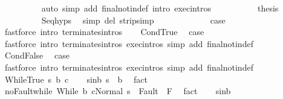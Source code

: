 \begin{isabellebody}
\ \ \ \ \ \ \ \ \isamarkupfalse%
\ {\isacharparenleft}auto\ simp\ add{\isacharcolon}\ final{\isacharunderscore}notin{\isacharunderscore}def\ intro{\isacharcolon}\ exec{\isachardot}intros{\isacharparenright}\isanewline
\ \ \ \ \ \ \isamarkupfalse%
\ {\isacharasterisk}\ \isamarkupfalse%
\ {\isacharquery}thesis\isanewline
\ \ \ \ \ \ \ \ \isamarkupfalse%
\ Seq{\isachardot}hyps\ \isamarkupfalse%
\ {\isacharparenleft}simp\ del{\isacharcolon}\ strip{\isacharunderscore}simp{\isacharparenright}\isanewline
\ \ \ \ \isamarkupfalse%
\isanewline
\ \ \isacommand{{\isacharbraceright}}\isamarkupfalse%
\isanewline
\ \ \isamarkupfalse%
\ \isamarkupfalse%
\ {\isacharquery}case\isanewline
\ \ \ \ \isamarkupfalse%
\ {\isacharparenleft}fastforce\ intro{\isacharcolon}\ terminates{\isachardot}intros{\isacharparenright}\isanewline
{}\isamarkupfalse%
\isanewline
\ \ \isamarkupfalse%
\ CondTrue\ \isamarkupfalse%
\ {\isacharquery}case\isanewline
\ \ \ \ \isamarkupfalse%
\ {\isacharparenleft}fastforce\ intro{\isacharcolon}\ terminates{\isachardot}intros\ exec{\isachardot}intros\ simp\ add{\isacharcolon}\ final{\isacharunderscore}notin{\isacharunderscore}def\ {\isacharparenright}\ \isanewline
{}\isamarkupfalse%
\isanewline
\ \ \isamarkupfalse%
\ CondFalse\ \isamarkupfalse%
\ {\isacharquery}case\isanewline
\ \ \ \ \isamarkupfalse%
\ {\isacharparenleft}fastforce\ intro{\isacharcolon}\ terminates{\isachardot}intros\ exec{\isachardot}intros\ simp\ add{\isacharcolon}\ final{\isacharunderscore}notin{\isacharunderscore}def\ {\isacharparenright}\ \isanewline
{}\isamarkupfalse%
\isanewline
\ \ \isamarkupfalse%
\ {\isacharparenleft}WhileTrue\ s\ b\ c{\isacharparenright}\isanewline
\ \ \isamarkupfalse%
\ s{\isacharunderscore}in{\isacharunderscore}b{\isacharcolon}\ {\isachardoublequoteopen}s\ {\isasymin}\ b{\isachardoublequoteclose}\ \isamarkupfalse%
\ fact\isanewline
\ \ \isamarkupfalse%
\ noFault{\isacharunderscore}while{\isacharcolon}\ {\isachardoublequoteopen}{\isasymGamma}{\isasymturnstile}{\isasymlangle}While\ b\ c{\isacharcomma}Normal\ s\ {\isasymrangle}\ {\isasymRightarrow}{\isasymnotin}Fault\ {\isacharbackquote}\ F{\isachardoublequoteclose}\ \isamarkupfalse%
\ fact\isanewline
\ \ \isamarkupfalse%
\ s{\isacharunderscore}in{\isacharunderscore}b\ \isamarkupfalse%

\end{isabellebody}
